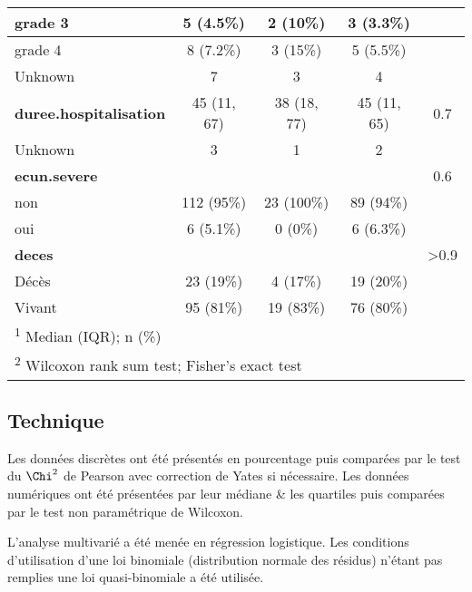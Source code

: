 \documentclass[
  10pt,
  a4paper,
]{scrartcl}
\begin{document}
\begin{table}
\begin{tabular}[t]{l|c|c|c|c}
\hline
\hspace{1em}grade 3 & 5 (4.5\%) & 2 (10\%) & 3 (3.3\%) & \\
\hline
\hspace{1em}grade 4 & 8 (7.2\%) & 3 (15\%) & 5 (5.5\%) & \\
\hline
\hspace{1em}Unknown & 7 & 3 & 4 & \\
\hline
\textbf{duree.hospitalisation} & 45 (11, 67) & 38 (18, 77) & 45 (11, 65) & 0.7\\
\hline
\hspace{1em}Unknown & 3 & 1 & 2 & \\
\hline
\textbf{ecun.severe} &  &  &  & 0.6\\
\hline
\hspace{1em}non & 112 (95\%) & 23 (100\%) & 89 (94\%) & \\
\hline
\hspace{1em}oui & 6 (5.1\%) & 0 (0\%) & 6 (6.3\%) & \\
\hline
\textbf{deces} &  &  &  & >0.9\\
\hline
\hspace{1em}Décès & 23 (19\%) & 4 (17\%) & 19 (20\%) & \\
\hline
\hspace{1em}Vivant & 95 (81\%) & 19 (83\%) & 76 (80\%) & \\
\hline
\multicolumn{5}{l}{\rule{0pt}{1em}\textsuperscript{1} Median (IQR); n (\%)}\\
\multicolumn{5}{l}{\rule{0pt}{1em}\textsuperscript{2} Wilcoxon rank sum test; Fisher's exact test}\\
\end{tabular}
\end{table}

\hypertarget{technique}{%
\subsection{Technique}\label{technique}}

Les données discrètes ont été présentés en pourcentage puis comparées
par le test du \(\Chi^2\) de Pearson avec correction de Yates si
nécessaire. Les données numériques ont été présentées par leur médiane
\& les quartiles puis comparées par le test non paramétrique de
Wilcoxon.

L'analyse multivarié a été menée en régression logistique. Les
conditions d'utilisation d'une loi binomiale (distribution normale des
résidus) n'étant pas remplies une loi quasi-binomiale a été utilisée.
\end{document}
